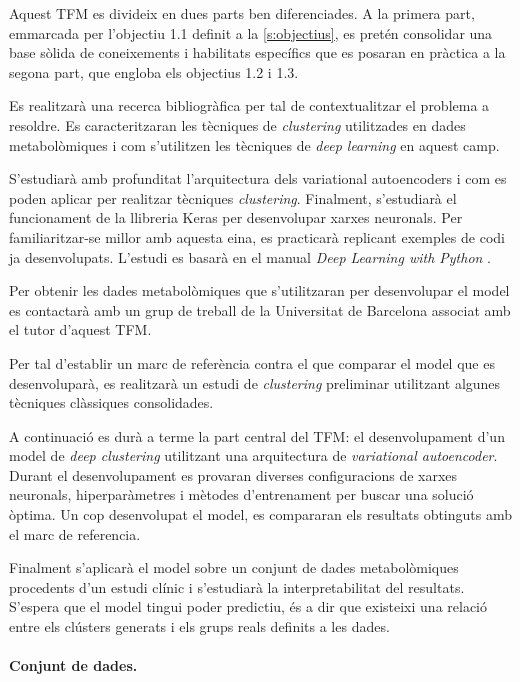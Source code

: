 \documentclass[CAT,BIB]{TFUOC}%
\begin{document}
    Aquest TFM es divideix en dues parts ben diferenciades. A la primera part, emmarcada per l'objectiu 1.1 definit a la \cref{s:objectius}, es pretén consolidar una base sòlida de coneixements i habilitats específics que es posaran en pràctica a la segona part, que engloba els objectius 1.2 i 1.3.

    Es realitzarà una recerca bibliogràfica per tal de contextualitzar el problema a resoldre. Es caracteritzaran les tècniques de \textit{clustering} utilitzades en dades metabolòmiques i com s'utilitzen les tècniques de \textit{deep learning} en aquest camp.

    S'estudiarà amb profunditat l'arquitectura dels variational autoencoders i com es poden aplicar per realitzar tècniques \textit{clustering}. Finalment, s'estudiarà el funcionament de la llibreria Keras per desenvolupar xarxes neuronals. Per familiaritzar-se millor amb aquesta eina, es practicarà replicant exemples de codi ja desenvolupats. L'estudi es basarà en el manual \textit{Deep Learning with Python} \citep{Ketkar2021}.

    Per obtenir les dades metabolòmiques que s'utilitzaran per desenvolupar el model es contactarà amb un grup de treball de la Universitat de Barcelona associat amb el tutor d'aquest TFM.

    Per tal d'establir un marc de referència contra el que comparar el model que es desenvoluparà, es realitzarà un estudi de \textit{clustering} preliminar utilitzant algunes tècniques clàssiques consolidades.

    A continuació es durà a terme la part central del TFM: el desenvolupament d'un model de \textit{deep clustering} utilitzant una arquitectura de \textit{variational autoencoder}. Durant el desenvolupament es provaran diverses configuracions de xarxes neuronals, hiperparàmetres i mètodes d'entrenament per buscar una solució òptima. Un cop desenvolupat el model, es compararan els resultats obtinguts amb el marc de referencia.

    Finalment s'aplicarà el model sobre un conjunt de dades metabolòmiques procedents d'un estudi clínic i s'estudiarà la interpretabilitat del resultats. S'espera que el model tingui poder predictiu, és a dir que existeixi una relació entre els clústers generats i els grups reals definits a les dades.

    \paragraph{Conjunt de dades.}
\end{document}
